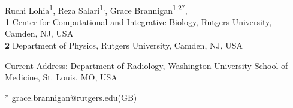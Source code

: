 \documentclass[10pt,letterpaper]{article}
\begin{document}
\vspace*{0.2in}

\begin{flushleft}
{\Large
\textbf{} %
}
\newline
\\
Ruchi Lohia\textsuperscript{1},
Reza Salari\textsuperscript{1,\textcurrency},
Grace Brannigan\textsuperscript{1,2*},
\\
\bigskip
\textbf{1} Center for Computational and Integrative Biology, Rutgers University, Camden, NJ, USA
\\
\textbf{2} Department of Physics, Rutgers University, Camden, NJ, USA
\\
\bigskip

% 
%


\textcurrency Current Address: Department of Radiology, Washington University School of Medicine, St. Louis, MO, USA



* grace.brannigan@rutgers.edu(GB)

\end{flushleft}
\end{document}
